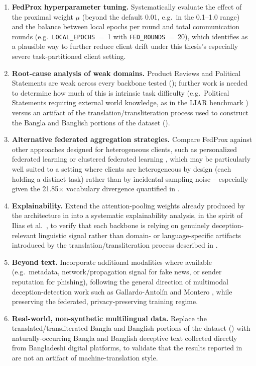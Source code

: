 \begin{enumerate}
    \item \textbf{FedProx hyperparameter tuning.} Systematically evaluate the effect of the proximal weight $\mu$ (beyond the default 0.01, e.g.\ in the 0.1--1.0 range) and the balance between local epochs per round and total communication rounds (e.g.\ \texttt{LOCAL\_EPOCHS}~=~1 with \texttt{FED\_ROUNDS}~=~20), which  identifies as a plausible way to further reduce client drift under this thesis's especially severe task-partitioned client setting.
    \item \textbf{Root-cause analysis of weak domains.} Product Reviews and Political Statements are weak across every backbone tested (); further work is needed to determine how much of this is intrinsic task difficulty (e.g.\ Political Statements requiring external world knowledge, as in the LIAR benchmark \cite{wang2017liar}) versus an artifact of the translation/transliteration process used to construct the Bangla and Banglish portions of the dataset ().
    \item \textbf{Alternative federated aggregation strategies.} Compare FedProx against other approaches designed for heterogeneous clients, such as personalized federated learning or clustered federated learning \cite{ghosh2020efficient}, which may be particularly well suited to a setting where clients are heterogeneous by design (each holding a distinct task) rather than by incidental sampling noise -- especially given the 21.85$\times$ vocabulary divergence quantified in .
    \item \textbf{Explainability.} Extend the attention-pooling weights already produced by the architecture in  into a systematic explainability analysis, in the spirit of Ilias et al.\ \cite{ilias2022explainable}, to verify that each backbone is relying on genuinely deception-relevant linguistic signal rather than domain- or language-specific artifacts introduced by the translation/transliteration process described in .
    \item \textbf{Beyond text.} Incorporate additional modalities where available (e.g.\ metadata, network/propagation signal for fake news, or sender reputation for phishing), following the general direction of multimodal deception-detection work such as Gallardo-Antol{\'i}n and Montero \cite{gallardo2021detecting}, while preserving the federated, privacy-preserving training regime.
    \item \textbf{Real-world, non-synthetic multilingual data.} Replace the translated/transliterated Bangla and Banglish portions of the dataset () with naturally-occurring Bangla and Banglish deceptive text collected directly from Bangladeshi digital platforms, to validate that the results reported in  are not an artifact of machine-translation style.
\end{enumerate}
